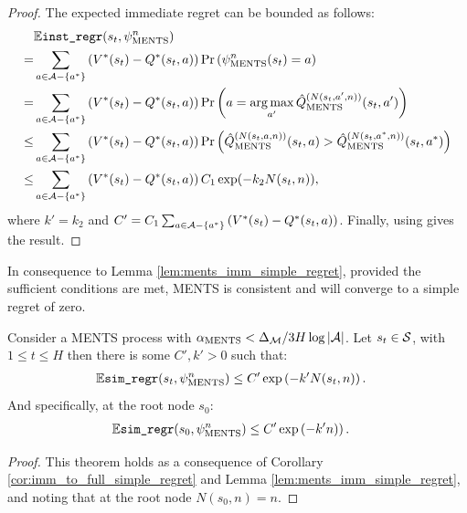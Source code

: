 \begin{proof}
            The expected immediate regret can be bounded as follows:
            \begin{align}
                & \mathbb{E}{\textnormal{\texttt{inst\_regr}}}(s_t,\psi^{n}_{{\textnormal{MENTS}}})  \\
                    =& \sum_{a\in\mathcal{A}-\{a^*\}} 
                        \left(V^*(s_t)-Q^*(s_t,a)\right) \Pr\left(\psi^{n}_{{\textnormal{MENTS}}}(s_t) =a \right) \\
                    =& \sum_{a\in\mathcal{A}-\{a^*\}} 
                        \left(V^*(s_t)-Q^*(s_t,a)\right) \Pr\left(a = \operatorname*{arg\,max}_{a'} {\hat{Q}^{(N(s_t,a',n))}_{{\textnormal{MENTS}}}}(s_t,a') \right) \\
                    \leq& \sum_{a\in\mathcal{A}-\{a^*\}} 
                        \left(V^*(s_t)-Q^*(s_t,a)\right) \Pr\left({\hat{Q}^{(N(s_t,a,n))}_{{\textnormal{MENTS}}}}(s_t,a) > {\hat{Q}^{(N(s_t,a^*,n))}_{{\textnormal{MENTS}}}}(s_t,a^*)  \right) \\
                    \leq&  \sum_{a\in\mathcal{A}-\{a^*\}} 
                        \left(V^*(s_t)-Q^*(s_t,a)\right) C_1 \exp(-k_2N(s_t,n)),
            \end{align}
            where $k'=k_2$ and $C'=C_1\sum_{a\in\mathcal{A}-\{a^*\}} \left(V^*(s_t)-Q^*(s_t,a)\right)$. Finally, using  gives the result.
        \end{proof}









        
        In consequence to Lemma \ref{lem:ments_imm_simple_regret}, provided the sufficient conditions are met, MENTS is consistent and will converge to a simple regret of zero.
        \begin{theorem} \label{thrm:ments_simple_regret_converge}
            Consider a MENTS process with ${\alpha_{{\textnormal{MENTS}}}}<\Delta_{\mathcal{M}}/3H\log |\mathcal{A}|$.  Let $s_t\in\mathcal{S}$, with $1\leq t \leq H$  then there is some $C',k'>0$ such that:
            \begin{align}
                \mathbb{E} {\textnormal{\texttt{sim\_regr}}}(s_{t},\psi^{n}_{{\textnormal{MENTS}}}) &\leq C'\exp\left( -k' N(s_{t},n) \right).
            \end{align}
            And specifically, at the root node $s_0$:
            \begin{align}
                \mathbb{E} {\textnormal{\texttt{sim\_regr}}}(s_{0},\psi^{n}_{{\textnormal{MENTS}}}) &\leq C'\exp\left( -k'n) \right).
            \end{align}
        \end{theorem}
        \begin{proof}
            This theorem holds as a consequence of Corollary \ref{cor:imm_to_full_simple_regret} and Lemma \ref{lem:ments_imm_simple_regret}, and noting that at the root node $N(s_0,n)=n$.
        \end{proof}









